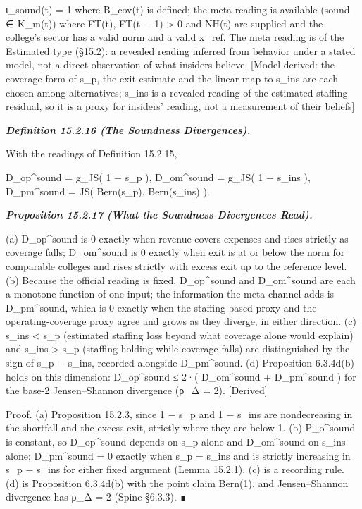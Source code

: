 \documentclass[
]{article}
\begin{document}
ι\_sound(t) = 1 where B\_cov(t) is defined; the meta reading is
available (sound ∈ K\_m(t)) where FT(t), FT(t − 1) \textgreater{} 0 and
NH(t) are supplied and the college's sector has a valid norm and a valid
x\_ref. The meta reading is of the Estimated type (§15.2): a revealed
reading inferred from behavior under a stated model, not a direct
observation of what insiders believe. {[}Model-derived: the coverage
form of s\_p, the exit estimate and the linear map to s\_ins are each
chosen among alternatives; s\_ins is a revealed reading of the estimated
staffing residual, so it is a proxy for insiders' reading, not a
measurement of their beliefs{]}

\emph{\textbf{Definition 15.2.16 (The Soundness Divergences).}}

With the readings of Definition 15.2.15,

D\_op\^{}sound = g\_JS( 1 − s\_p ), D\_om\^{}sound = g\_JS( 1 − s\_ins
), D\_pm\^{}sound = JS( Bern(s\_p), Bern(s\_ins) ).

\emph{\textbf{Proposition 15.2.17 (What the Soundness Divergences
Read).}}

(a) D\_op\^{}sound is 0 exactly when revenue covers expenses and rises
strictly as coverage falls; D\_om\^{}sound is 0 exactly when exit is at
or below the norm for comparable colleges and rises strictly with excess
exit up to the reference level. (b) Because the official reading is
fixed, D\_op\^{}sound and D\_om\^{}sound are each a monotone function of
one input; the information the meta channel adds is D\_pm\^{}sound,
which is 0 exactly when the staffing-based proxy and the
operating-coverage proxy agree and grows as they diverge, in either
direction. (c) s\_ins \textless{} s\_p (estimated staffing loss beyond
what coverage alone would explain) and s\_ins \textgreater{} s\_p
(staffing holding while coverage falls) are distinguished by the sign of
s\_p − s\_ins, recorded alongside D\_pm\^{}sound. (d) Proposition
6.3.4d(b) holds on this dimension: D\_op\^{}sound ≤ 2·( D\_om\^{}sound +
D\_pm\^{}sound ) for the base-2 Jensen--Shannon divergence (ρ\_Δ = 2).
{[}Derived{]}

Proof. (a) Proposition 15.2.3, since 1 − s\_p and 1 − s\_ins are
nondecreasing in the shortfall and the excess exit, strictly where they
are below 1. (b) P\_o\^{}sound is constant, so D\_op\^{}sound depends on
s\_p alone and D\_om\^{}sound on s\_ins alone; D\_pm\^{}sound = 0
exactly when s\_p = s\_ins and is strictly increasing in \textbar s\_p −
s\_ins\textbar{} for either fixed argument (Lemma 15.2.1). (c) is a
recording rule. (d) is Proposition 6.3.4d(b) with the point claim
Bern(1), and Jensen--Shannon divergence has ρ\_Δ = 2 (Spine §6.3.3). ∎
\end{document}

